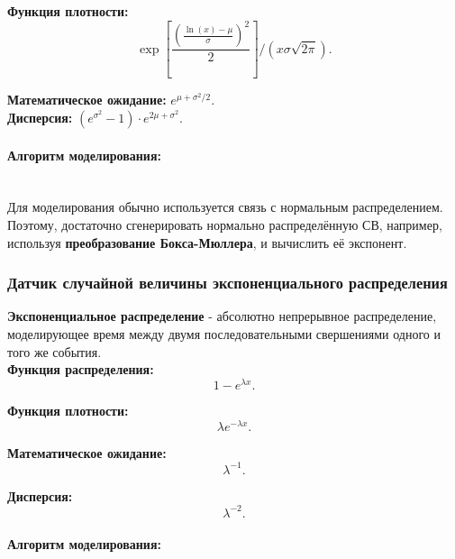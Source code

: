 \textbf{Функция плотности:}
\begin{equation}
	\exp\left[\frac{\left(\frac{\ln(x)-\mu}{\sigma}\right)^{2}}{2}\right]/\left(x\sigma\sqrt{2\pi}\right).
\end{equation}

\textbf{Математическое ожидание:} $e^{\mu+\sigma^{2}/2}$.\\

\textbf{Дисперсия:} $(e^{\sigma^{2}}-1)\cdot e^{2\mu+\sigma^{2}}$.

\paragraph{Алгоритм моделирования:}\
\\

Для моделирования обычно используется связь с нормальным распределением. Поэтому, достаточно сгенерировать нормально распределённую СВ, например, используя \textbf{преобразование Бокса-Мюллера}, и вычислить её экспонент.

\subsubsection{Датчик случайной величины экспоненциального распределения}

\textbf{Экспоненциальное распределение} - абсолютно непрерывное распределение, моделирующее время между двумя последовательными свершениями одного и того же события.\\

\textbf{Функция распределения:}
\begin{equation}
	1-e^{\lambda x}.
\end{equation}

\textbf{Функция плотности:}
\begin{equation}
	\lambda e^{-\lambda x}.
\end{equation}

\textbf{Математическое ожидание:}
\begin{equation}
	\lambda^{-1}.
\end{equation}

\textbf{Дисперсия:}
\begin{equation}
	\lambda^{-2}.
\end{equation}

\paragraph{Алгоритм моделирования:}\
\\

